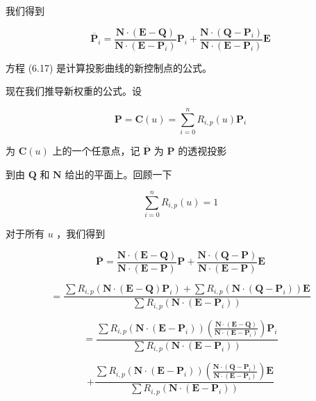 \documentclass[../main.tex]{subfiles}
\begin{document}
我们得到

\[
{\overline{\mathbf{P}}}_{i} = \frac{\mathbf{N} \cdot  \left( {\mathbf{E} - \mathbf{Q}}\right) }{\mathbf{N} \cdot  \left( {\mathbf{E} - {\mathbf{P}}_{i}}\right) }{\mathbf{P}}_{i} + \frac{\mathbf{N} \cdot  \left( {\mathbf{Q} - {\mathbf{P}}_{i}}\right) }{\mathbf{N} \cdot  \left( {\mathbf{E} - {\mathbf{P}}_{i}}\right) }\mathbf{E} \tag{6.17}
\]

方程 (6.17) 是计算投影曲线的新控制点的公式。

现在我们推导新权重的公式。设

\[
\mathbf{P} = \mathbf{C}\left( u\right)  = \mathop{\sum }\limits_{{i = 0}}^{n}{R}_{i,p}\left( u\right) {\mathbf{P}}_{i}
\]

为 \(\mathbf{C}\left( u\right)\) 上的一个任意点，记 \(\overline{\mathbf{P}}\) 为 \(\mathbf{P}\) 的透视投影

到由 \(\mathbf{Q}\) 和 \(\mathbf{N}\) 给出的平面上。回顾一下

\[
\mathop{\sum }\limits_{{i = 0}}^{n}{R}_{i,p}\left( u\right)  = 1
\]

对于所有 \(u\) ，我们得到

\[
\overline{\mathbf{P}} = \frac{\mathbf{N} \cdot  \left( {\mathbf{E} - \mathbf{Q}}\right) }{\mathbf{N} \cdot  \left( {\mathbf{E} - \mathbf{P}}\right) }\mathbf{P} + \frac{\mathbf{N} \cdot  \left( {\mathbf{Q} - \mathbf{P}}\right) }{\mathbf{N} \cdot  \left( {\mathbf{E} - \mathbf{P}}\right) }\mathbf{E}
\]

\[
= \frac{\sum {R}_{i,p}\left( {\mathbf{N} \cdot  \left( {\mathbf{E} - \mathbf{Q}}\right) {\mathbf{P}}_{i}}\right) +\sum {R}_{i,p}\left( {\mathbf{N} \cdot  \left( {\mathbf{Q} - {\mathbf{P}}_{i}}\right) }\right) \mathbf{E}}{\sum {R}_{i,p}\left( {\mathbf{N} \cdot  \left( {\mathbf{E} - {\mathbf{P}}_{i}}\right) }\right) }
\]

\[
= \frac{\sum {R}_{i,p}\left( {\mathbf{N} \cdot  \left( {\mathbf{E} - {\mathbf{P}}_{i}}\right) }\right) \left( \frac{\mathbf{N} \cdot  \left( {\mathbf{E} - \mathbf{Q}}\right) }{\mathbf{N} \cdot  \left( {\mathbf{E} - {\mathbf{P}}_{i}}\right) }\right) {\mathbf{P}}_{i}}{\sum {R}_{i,p}\left( {\mathbf{N} \cdot  \left( {\mathbf{E} - {\mathbf{P}}_{i}}\right) }\right) }
\]

\[
+ \frac{\sum {R}_{i,p}\left( {\mathbf{N} \cdot  \left( {\mathbf{E} - {\mathbf{P}}_{i}}\right) }\right) \left( \frac{\mathbf{N} \cdot  \left( {\mathbf{Q} - {\mathbf{P}}_{i}}\right) }{\mathbf{N} \cdot  \left( {\mathbf{E} - {\mathbf{P}}_{i}}\right) }\right) \mathbf{E}}{\sum {R}_{i,p}\left( {\mathbf{N} \cdot  \left( {\mathbf{E} - {\mathbf{P}}_{i}}\right) }\right) }
\]
\end{document}
